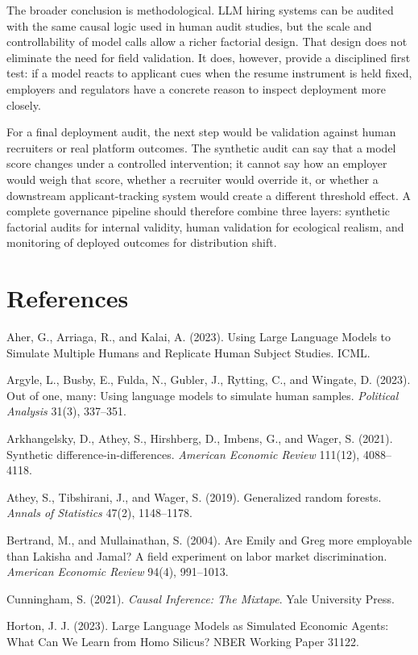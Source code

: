 \documentclass[10pt,twocolumn,letterpaper]{article}
\begin{document}
The broader conclusion is methodological. LLM hiring systems can be audited with the same causal logic used in human audit studies, but the scale and controllability of model calls allow a richer factorial design. That design does not eliminate the need for field validation. It does, however, provide a disciplined first test: if a model reacts to applicant cues when the resume instrument is held fixed, employers and regulators have a concrete reason to inspect deployment more closely.

For a final deployment audit, the next step would be validation against human recruiters or real platform outcomes. The synthetic audit can say that a model score changes under a controlled intervention; it cannot say how an employer would weigh that score, whether a recruiter would override it, or whether a downstream applicant-tracking system would create a different threshold effect. A complete governance pipeline should therefore combine three layers: synthetic factorial audits for internal validity, human validation for ecological realism, and monitoring of deployed outcomes for distribution shift.

\section*{References}

\small
Aher, G., Arriaga, R., and Kalai, A. (2023). Using Large Language Models to Simulate Multiple Humans and Replicate Human Subject Studies. ICML.

Argyle, L., Busby, E., Fulda, N., Gubler, J., Rytting, C., and Wingate, D. (2023). Out of one, many: Using language models to simulate human samples. \emph{Political Analysis} 31(3), 337--351.

Arkhangelsky, D., Athey, S., Hirshberg, D., Imbens, G., and Wager, S. (2021). Synthetic difference-in-differences. \emph{American Economic Review} 111(12), 4088--4118.

Athey, S., Tibshirani, J., and Wager, S. (2019). Generalized random forests. \emph{Annals of Statistics} 47(2), 1148--1178.

Bertrand, M., and Mullainathan, S. (2004). Are Emily and Greg more employable than Lakisha and Jamal? A field experiment on labor market discrimination. \emph{American Economic Review} 94(4), 991--1013.

Cunningham, S. (2021). \emph{Causal Inference: The Mixtape}. Yale University Press.

Horton, J. J. (2023). Large Language Models as Simulated Economic Agents: What Can We Learn from Homo Silicus? NBER Working Paper 31122.
\end{document}
